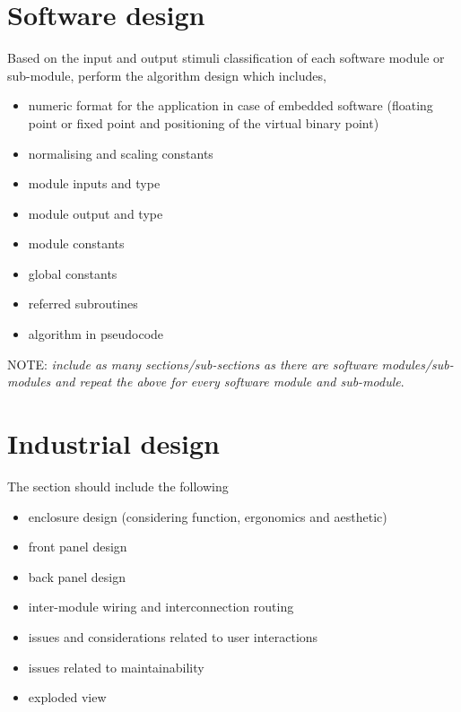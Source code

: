 \section{Software design}

Based on the input and output stimuli classification of each software
module or sub-module, perform the algorithm design which includes,
\begin{itemize}
\item numeric format for the application in case of embedded software (floating
point or fixed point and positioning of the virtual binary point)
\item normalising and scaling constants
\item module inputs and type
\item module output and type
\item module constants
\item global constants
\item referred subroutines
\item algorithm in pseudocode
\end{itemize}
NOTE: \emph{include as many sections/sub-sections as there are software
modules/sub-modules and repeat the above for every software module
and sub-module}.

\section{Industrial design}

The section should include the following
\begin{itemize}
\item enclosure design (considering function, ergonomics and aesthetic)
\item front panel design
\item back panel design
\item inter-module wiring and interconnection routing
\item issues and considerations related to user interactions
\item issues related to maintainability
\item exploded view
\end{itemize}

